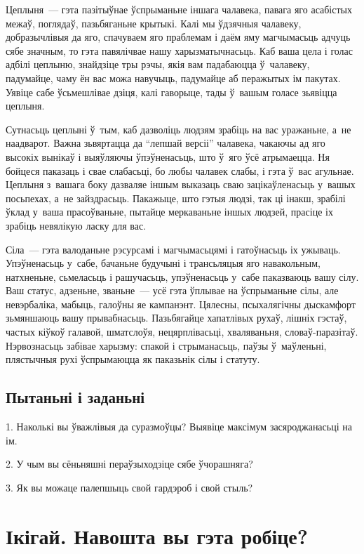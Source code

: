 Цеплыня~--- гэта пазітыўнае ўспрыманьне іншага чалавека, павага яго асабістых межаў, поглядаў, пазьбяганьне крытыкі. Калі мы ўдзячныя чалавеку, добразычлівыя да яго, спачуваем яго праблемам і даём яму магчымасьць адчуць сябе значным, то гэта павялічвае нашу харызматычнасьць. Каб ваша цела і голас адбілі цеплыню, знайдзіце тры рэчы, якія вам падабаюцца ў~чалавеку, падумайце, чаму ён вас можа навучыць, падумайце аб перажытых ім пакутах. Уявіце сабе ўсьмешлівае дзіця, калі гаворыце, тады ў~вашым голасе зьявіцца цеплыня.

Сутнасьць цеплыні ў~тым, каб дазволіць людзям зрабіць на вас уражаньне, а~не наадварот. Важна зьвяртацца да ``лепшай версіі'' чалавека, чакаючы ад яго высокіх вынікаў і выяўляючы ўпэўненасьць, што ў~яго ўсё атрымаецца. Ня бойцеся паказаць і свае слабасьці, бо любы чалавек слабы, і гэта ў~вас агульнае. Цеплыня з~вашага боку дазваляе іншым выказаць сваю зацікаўленасьць у~вашых посьпехах, а~не зайздрасьць. Пакажыце, што гэтыя людзі, так ці інакш, зрабілі ўклад у~ваша прасоўваньне, пытайце меркаваньне іншых людзей, прасіце іх зрабіць невялікую ласку для вас.

Сіла~--- гэта валоданьне рэсурсамі і магчымасьцямі і гатоўнасьць іх ужываць. Упэўненасьць у~сабе, бачаньне будучыні і трансьляцыя яго навакольным, натхненьне, сьмеласьць і рашучасьць, упэўненасьць у~сабе паказваюць вашу сілу. Ваш статус, адзеньне, званьне~--- усё гэта ўплывае на ўспрыманьне сілы, але невэрбаліка, мабыць, галоўны яе кампанэнт. Цялесны, псыхалягічны дыскамфорт зьмяншаюць вашу прывабнасьць. Пазьбягайце хапатлівых рухаў, лішніх гэстаў, частых кіўкоў галавой, шматслоўя, нецярплівасьці, хваляваньня, словаў-паразітаў. Нэрвознасьць забівае харызму: спакой і стрыманасьць, паўзы ў~маўленьні, плястычныя рухі ўспрымаюцца як паказьнік сілы і статуту.

\subsection*{Пытаньні і заданьні}

1. Наколькі вы ўважлівыя да суразмоўцы? Выявіце максімум засяроджанасьці на ім.

2. У чым вы сёньняшні пераўзыходзіце сябе ўчорашняга?

3. Як вы можаце палепшыць свой гардэроб і свой стыль?


\section{Ікігай. Навошта вы гэта робіце?}

